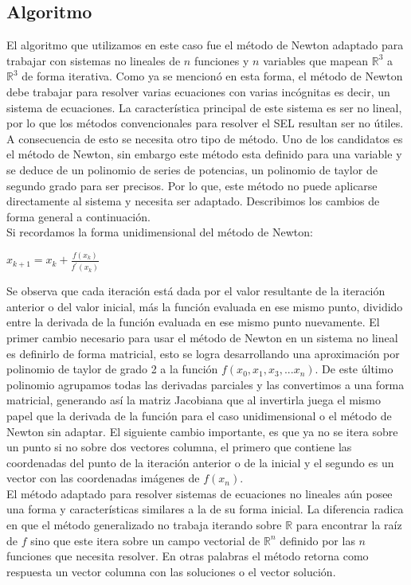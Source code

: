 ﻿\documentclass[11pt]{article}
\begin{document}
\subsection{Algoritmo}
El algoritmo que utilizamos en este caso fue el  método de Newton adaptado para trabajar con sistemas no lineales de $n$ funciones y $n$ variables que mapean $\mathbb{R}^3$ a $\mathbb{R}^3$ de forma iterativa. Como ya se mencionó en esta forma, el método de Newton debe trabajar para resolver varias ecuaciones con varias incógnitas es decir, un sistema de ecuaciones. La característica principal de este sistema es ser no lineal, por lo que los métodos convencionales para resolver el SEL resultan ser no útiles. A consecuencia de esto se necesita otro tipo de método. Uno de los candidatos es el método de Newton, sin embargo este método esta definido para una variable y se deduce de un polinomio de series de potencias, un polinomio de taylor de segundo grado para ser precisos. Por lo que, este método no puede aplicarse directamente al sistema y necesita ser adaptado. Describimos los cambios de forma general a continuación.\\

Si recordamos la forma unidimensional del método de Newton:\\
\begin{center}
$x_{k+1} = x_{k} + \frac{f(x_{k})}{f^\prime(x_{k})} \label{eq:1}$\\
\end{center}

Se observa que cada iteración está dada por el valor resultante de la iteración anterior o del valor inicial, más la función evaluada en ese mismo punto, dividido entre la derivada de la función evaluada en ese mismo punto nuevamente. El primer cambio necesario para usar el método de Newton en un sistema no lineal es definirlo de forma matricial, esto se logra desarrollando una aproximación por polinomio de taylor de grado 2 a la función $f(x_{0},x_{1},x_{3},...x_{n})$. De este último polinomio agrupamos todas las derivadas parciales y las convertimos a una forma matricial, generando así la matriz Jacobiana que al invertirla juega el mismo papel que la derivada de la función para el caso unidimensional o el método de Newton sin adaptar. El siguiente cambio importante, es que ya no se itera sobre un punto si no sobre dos vectores columna, el primero que contiene las coordenadas del punto de la iteración anterior o de la inicial y el segundo es un vector con las coordenadas imágenes de $f(x_{n})$.\\
El método adaptado para resolver sistemas de ecuaciones no lineales aún posee una forma y características similares a la de su forma inicial. La diferencia radica en que el método generalizado no trabaja iterando sobre $\mathbb{R}$ para encontrar la raíz de $f$ sino que este itera sobre un campo vectorial de $\mathbb{R}^n$ definido por las $n$ funciones que necesita resolver. En otras palabras el método retorna como respuesta un vector columna con las soluciones o el vector solución.\\
\end{document}
